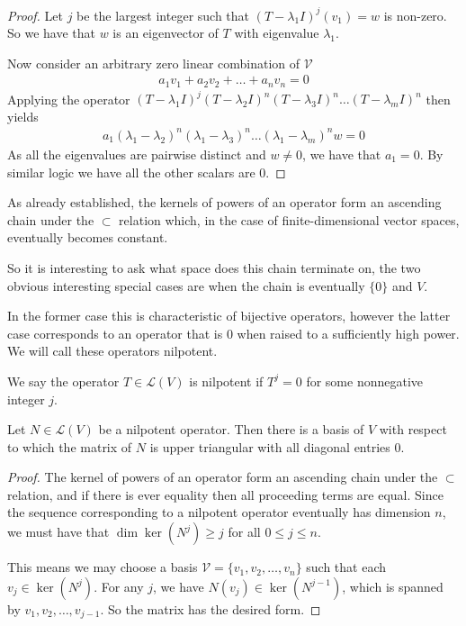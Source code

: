 \documentclass[]{article}
\begin{document}
\begin{proof}
		Let $j$ be the largest integer such that $(T-\lambda_1 I)^j(v_1) = w$ is non-zero. So we have that $w$ is an eigenvector of $T$ with eigenvalue $\lambda_1$. 

		Now consider an arbitrary zero linear combination of $\mathcal{V}$ 
		\begin{align*}
				a_1 v_1 + a_2 v_2 + \ldots + a_n v_n = 0
		\end{align*}
		Applying the operator $(T-\lambda_1 I)^j (T-\lambda_2 I)^n (T - \lambda_3 I)^n \ldots (T - \lambda_m I)^n$ then yields
		\begin{align*}
				a_1 (\lambda_1 - \lambda_2)^n (\lambda_1 - \lambda_3)^n \ldots (\lambda_1 - \lambda_m)^n w = 0
		\end{align*}
		As all the eigenvalues are pairwise distinct and $w \neq 0$, we have that $a_1 = 0$. By similar logic we have all the other scalars are $0$.
\end{proof}

As already established, the kernels of powers of an operator form an ascending chain under the $\subset$ relation which, in the case of finite-dimensional vector spaces, eventually becomes constant.

So it is interesting to ask what space does this chain terminate on, the two obvious interesting special cases are when the chain is eventually $\{0\}$ and $V$. 

In the former case this is characteristic of bijective operators, however the latter case corresponds to an operator that is $0$ when raised to a sufficiently high power. We will call these operators nilpotent.

\begin{defi} 
		We say the operator $T \in \mathcal{L}(V)$ is nilpotent if $T^j = 0$ for some nonnegative integer $j$.
\end{defi}

\begin{thm}
		Let $N \in \mathcal{L}(V)$ be a nilpotent operator. Then there is a basis of $V$ with respect to which the matrix of $N$ is upper triangular with all diagonal entries $0$.
\end{thm}

\begin{proof}
		The kernel of powers of an operator form an ascending chain under the $\subset$ relation, and if there is ever equality then all proceeding terms are equal. Since the sequence corresponding to a nilpotent operator eventually has dimension $n$, we must have that $\dim \ker(N^j) \geq j$ for all $0 \leq j \leq n$. 
		
		This means we may choose a basis $\mathcal{V} = \{v_1,v_2,\ldots,v_n\}$ such that each $v_j \in \ker(N^j)$. For any $j$, we have $N(v_j) \in \ker(N^{j-1})$, which is spanned by $v_1,v_2,\ldots,v_{j-1}$. So the matrix has the desired form.
\end{proof}
\end{document}
